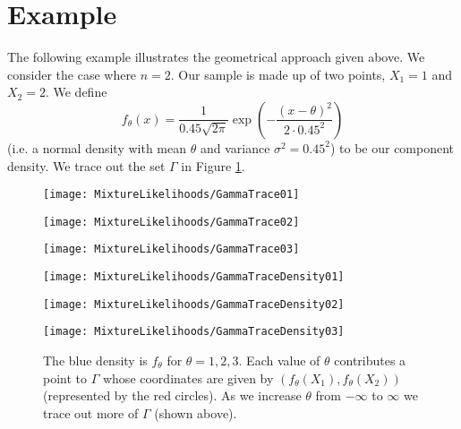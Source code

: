 \section{Example}
\label{sec:mixturelikelihoods:example}
	The following example illustrates the geometrical approach given above. We consider the case where $n = 2$. Our sample is made up of two points, $X_1 = 1$ and $X_2 = 2$. We define
	\begin{equation}
	f_\theta(x) = \frac{1}{0.45 \sqrt{2 \pi}} \exp\left(-\frac{(x-\theta)^2}{2\cdot 0.45^2}\right)
	\end{equation}
	(i.e. a normal density with mean $\theta$ and variance $\sigma^2 = 0.45^2$) to be our component density.
	We trace out the set $\Gamma$ in Figure \ref{fig:TracingGamma}. 

	\begin{figure}[ht]
		\centering
		\begin{minipage}[b]{0.3\linewidth}
			\texttt{[image: MixtureLikelihoods/GammaTrace01]}
		\end{minipage}
		\begin{minipage}[b]{0.3\linewidth}
			\texttt{[image: MixtureLikelihoods/GammaTrace02]}
		\end{minipage}
		\begin{minipage}[b]{0.3\linewidth}
			\texttt{[image: MixtureLikelihoods/GammaTrace03]}
		\end{minipage}
		\begin{minipage}[b]{0.3\linewidth}
			\texttt{[image: MixtureLikelihoods/GammaTraceDensity01]}
		\end{minipage}
		\begin{minipage}[b]{0.3\linewidth}
			\texttt{[image: MixtureLikelihoods/GammaTraceDensity02]}
		\end{minipage}
		\begin{minipage}[b]{0.3\linewidth}
			\texttt{[image: MixtureLikelihoods/GammaTraceDensity03]}
		\end{minipage}
		\caption{The blue density is $f_\theta$ for $\theta = 1,2,3$. Each value of $\theta$ contributes a point to $\Gamma$ whose coordinates are given by $(f_\theta(X_1),f_\theta(X_2))$ (represented by the red circles). As we increase $\theta$ from $-\infty$ to $\infty$ we trace out more of $\Gamma$ (shown above).}\label{fig:TracingGamma}
	\end{figure}

